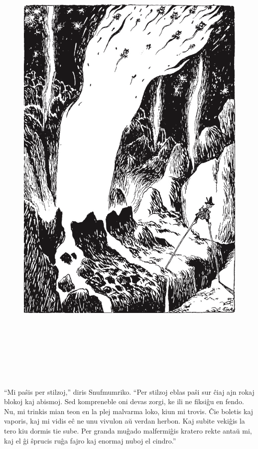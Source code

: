 \begin{figure}[htbp]
\centering
\includegraphics[width=450pt,height=660pt]{3-9.png}
\caption{}
\label{3-9}
\end{figure}

``Mi paŝis per stilzoj,'' diris Snufmumriko. ``Per stilzoj eblas paŝi sur ĉiaj ajn rokaj blokoj kaj abismoj. Sed kompreneble oni devas zorgi, ke ili ne fiksiĝu en fendo. Nu, mi trinkis mian teon en la plej malvarma loko, kiun mi trovis. Ĉie boletis kaj vaporis, kaj mi vidis eĉ ne unu vivulon aŭ verdan herbon. Kaj subite vekiĝis la tero kiu dormis tie sube. Per granda muĝado malfermiĝis kratero rekte antaŭ mi, kaj el ĝi ŝprucis ruĝa fajro kaj enormaj nuboj el cindro.''


